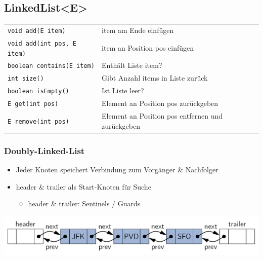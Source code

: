 \documentclass[a4paper, landscape, 8pt]{scrartcl}
\begin{document}
\begin{multicols*}{4}
            \subsection{LinkedList<E>}
                \begin{tabular}{l|p{3cm}}
                    \texttt{void add(E item)} & item am Ende einfügen \\
                    \texttt{void add(int pos, E item)} & item an Position pos einfügen \\
                    \texttt{boolean contains(E item)} & Enthält Liste item? \\
                    \texttt{int size()} & Gibt Anzahl items in Liste zurück \\
                    \texttt{boolean isEmpty()} & Ist Liste leer? \\
                    \texttt{E get(int pos)} & Element an Position pos zurückgeben \\
                    \texttt{E remove(int pos)} & Element an Position pos entfernen und zurückgeben \\
                \end{tabular}
            
                \subsubsection{Doubly-Linked-List}
                    \begin{itemize}
                        \item Jeder Knoten speichert Verbindung zum Vorgänger \& Nachfolger
                        \item header \& trailer als Start-Knoten für Suche
                        \begin{itemize}
                            \item header \& trailer: Sentinels / Guards
                        \end{itemize}
                    \end{itemize}
                    \includegraphics[scale=0.2,width=\columnwidth]{graphic/02_doubly-linkedlist}


\end{multicols*}
\end{document}
